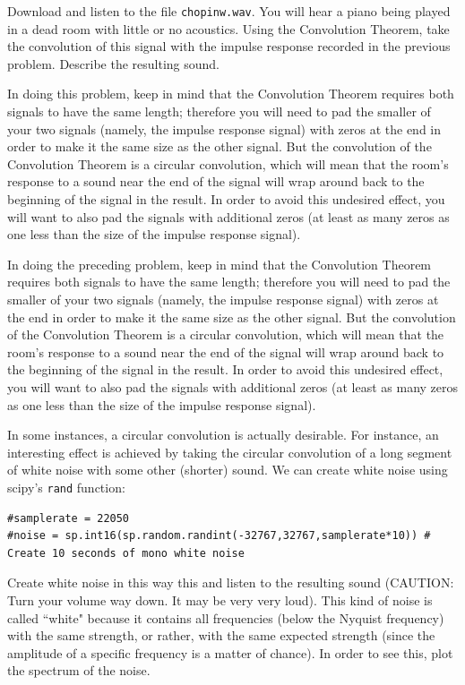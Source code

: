 \begin{problem}\label{convolution_problem}
Download and listen to the file \texttt{chopinw.wav}. You will hear a piano being played in a dead room with little or no acoustics. Using the Convolution Theorem, take the convolution of this signal with the impulse response recorded in the previous problem. Describe the resulting sound.

In doing this problem, keep in mind that the Convolution Theorem requires both signals to have the same length; therefore you will need to pad the smaller of your two signals (namely, the impulse response signal) with zeros at the end in order to make it the same size as the other signal. But the convolution of the Convolution Theorem is a circular convolution, which will mean that the room's response to a sound near the end of the signal will wrap around back to the beginning of the signal in the result. In order to avoid this undesired effect, you will want to also pad the signals with additional zeros (at least as many zeros as one less than the size of the impulse response signal).
\end{problem}

In doing the preceding problem, keep in mind that the Convolution Theorem requires both signals to have the same length; therefore you will need to pad the smaller of your two signals (namely, the impulse response signal) with zeros at the end in order to make it the same size as the other signal. But the convolution of the Convolution Theorem is a circular convolution, which will mean that the room's response to a sound near the end of the signal will wrap around back to the beginning of the signal in the result. In order to avoid this undesired effect, you will want to also pad the signals with additional zeros (at least as many zeros as one less than the size of the impulse response signal).

In some instances, a circular convolution is actually desirable. For instance, an interesting effect is achieved by taking the circular convolution of a long segment of white noise with some other (shorter) sound. We can create white noise using scipy's \texttt{rand} function:
\begin{lstlisting}
#samplerate = 22050
#noise = sp.int16(sp.random.randint(-32767,32767,samplerate*10)) # Create 10 seconds of mono white noise
\end{lstlisting}

\begin{problem}
Create white noise in this way this and listen to the resulting sound (CAUTION: Turn your volume way down.  It may be very very loud).  This kind of noise is called ``white" because it contains all frequencies (below the Nyquist frequency) with the same strength, or rather, with the same expected strength (since the amplitude of a specific frequency is a matter of chance). In order to see this, plot the spectrum of the noise.
\end{problem}

